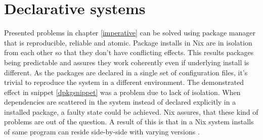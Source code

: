 



\section{Declarative systems} \label{declarativesystems}

Presented problems in chapter \ref{imperative} can be solved using
package manager that is reproducible, reliable and atomic. Package
installs in Nix are in isolation from each other so that they don't
have conflicting effects. This results packages being predictable and
assures they work coherently even if underlying install is
different. As the packages are declared in a single set of
configuration files, it's trivial to reproduce the system in a
different environment. The demonstrated effect in snippet
\ref{dpkgsnippet} was a problem due to lack of isolation. When
dependencies are scattered in the system instead of declared
explicitly in a installed package, a faulty state could be
achieved. Nix assures, that these kind of problems are out of the
question. A result of this is that in a Nix system installs of same
program can reside side-by-side with varying versions
\cite{dolstra2008nixos}.

